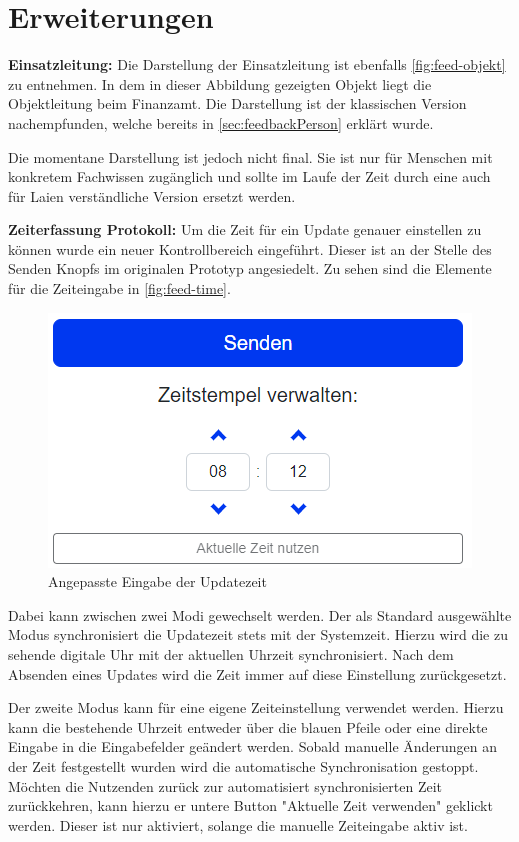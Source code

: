\section{Erweiterungen}\label{sec:erweiterung}

\textbf{Einsatzleitung:} Die Darstellung der Einsatzleitung ist ebenfalls \autoref{fig:feed-objekt} zu entnehmen.
In dem in dieser Abbildung gezeigten Objekt liegt die Objektleitung beim Finanzamt.
Die Darstellung ist der klassischen Version nachempfunden, welche bereits in \autoref{sec:feedbackPerson} erklärt wurde.

Die momentane Darstellung ist jedoch nicht final.
Sie ist nur für Menschen mit konkretem Fachwissen zugänglich und sollte im Laufe der Zeit durch eine auch für Laien verständliche Version ersetzt werden.


\textbf{Zeiterfassung Protokoll:} Um die Zeit für ein Update genauer einstellen zu können wurde ein neuer Kontrollbereich eingeführt.
Dieser ist an der Stelle des Senden Knopfs im originalen Prototyp angesiedelt.
Zu sehen sind die Elemente für die Zeiteingabe in \autoref{fig:feed-time}.

\begin{figure}[htp]
    \centering
    \includegraphics[width=.7\textwidth]{images/4-Feedback/time.png}
    \caption{Angepasste Eingabe der Updatezeit}
    \label{fig:feed-time}
\end{figure}

Dabei kann zwischen zwei Modi gewechselt werden.
Der als Standard ausgewählte Modus synchronisiert die Updatezeit stets mit der Systemzeit.
Hierzu wird die zu sehende digitale Uhr mit der aktuellen Uhrzeit synchronisiert.
Nach dem Absenden eines Updates wird die Zeit immer auf diese Einstellung zurückgesetzt.

Der zweite Modus kann für eine eigene Zeiteinstellung verwendet werden.
Hierzu kann die bestehende Uhrzeit entweder über die blauen Pfeile oder eine direkte Eingabe in die Eingabefelder geändert werden.
Sobald manuelle Änderungen an der Zeit festgestellt wurden wird die automatische Synchronisation gestoppt.
Möchten die Nutzenden zurück zur automatisiert synchronisierten Zeit zurückkehren, kann hierzu er untere Button "Aktuelle Zeit verwenden" geklickt werden.
Dieser ist nur aktiviert, solange die manuelle Zeiteingabe aktiv ist.

